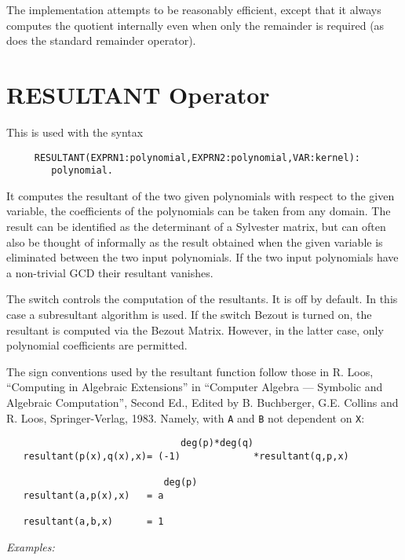 The implementation attempts to be reasonably efficient, except that it
always computes the quotient internally even when only the remainder
is required (as does the standard remainder operator).

\section{RESULTANT Operator}
\hypertarget{operator:RESULTANT}{}
\hypertarget{switch:BEZOUT}{}

This is used with the syntax
\begin{verbatim}
     RESULTANT(EXPRN1:polynomial,EXPRN2:polynomial,VAR:kernel):
        polynomial.
\end{verbatim}
It computes the resultant of the two given polynomials with respect to the
given variable, the coefficients of the polynomials can be taken from any
domain. The result can be identified as the determinant of a
Sylvester matrix, but can often also be thought of informally as the
result obtained when the given variable is eliminated between the two input
polynomials. If the two input polynomials have a non-trivial GCD their
resultant vanishes.

The switch  controls the computation of the
resultants. It is off by default. In this case a subresultant algorithm
is used. If the switch Bezout is turned on, the resultant is computed via
the Bezout Matrix. However, in the latter case, only polynomial coefficients
are permitted.

The sign conventions used by the resultant function follow those in R.
Loos, ``Computing in Algebraic Extensions'' in ``Computer Algebra --- Symbolic
and Algebraic Computation'', Second Ed., Edited by B. Buchberger, G.E.
Collins and R. Loos, Springer-Verlag, 1983. Namely, with \texttt{A} and \texttt{B}
not dependent on \texttt{X}:

\begin{verbatim}
                               deg(p)*deg(q)
   resultant(p(x),q(x),x)= (-1)             *resultant(q,p,x)

                            deg(p)
   resultant(a,p(x),x)   = a

   resultant(a,b,x)      = 1
\end{verbatim}

\textit{Examples:}

